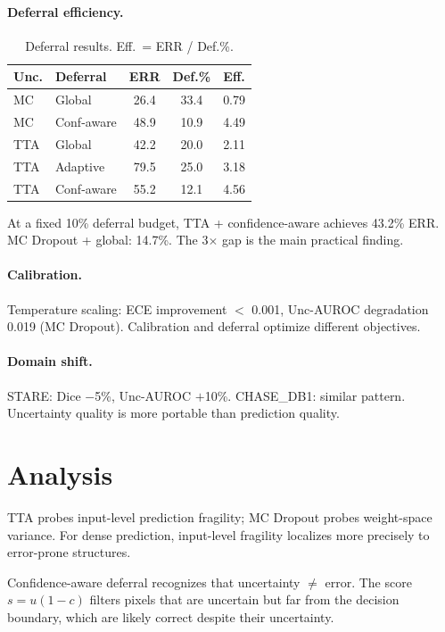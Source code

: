 \documentclass[11pt]{article}
\begin{document}
\paragraph{Deferral efficiency.}

\begin{table}[t]
\centering
\small
\begin{tabular}{llccc}
\toprule
Unc. & Deferral & ERR & Def.\% & Eff. \\
\midrule
MC & Global & 26.4 & 33.4 & 0.79 \\
MC & Conf-aware & 48.9 & 10.9 & 4.49 \\
TTA & Global & 42.2 & 20.0 & 2.11 \\
TTA & Adaptive & 79.5 & 25.0 & 3.18 \\
TTA & Conf-aware & 55.2 & 12.1 & 4.56 \\
\bottomrule
\end{tabular}
\caption{Deferral results. Eff.\ = ERR / Def.\%.}
\end{table}

At a fixed 10\% deferral budget, TTA + confidence-aware achieves 43.2\% ERR.
MC Dropout + global: 14.7\%. The 3$\times$ gap is the main practical finding.

\paragraph{Calibration.}
Temperature scaling: ECE improvement $<$ 0.001, Unc-AUROC degradation 0.019
(MC Dropout). Calibration and deferral optimize different objectives.

\paragraph{Domain shift.}
STARE: Dice $-$5\%, Unc-AUROC $+$10\%. CHASE\_DB1: similar pattern. Uncertainty
quality is more portable than prediction quality.

\section{Analysis}

TTA probes input-level prediction fragility; MC Dropout probes weight-space
variance. For dense prediction, input-level fragility localizes more precisely
to error-prone structures.

Confidence-aware deferral recognizes that uncertainty $\neq$ error. The score
$s = u(1-c)$ filters pixels that are uncertain but far from the decision
boundary, which are likely correct despite their uncertainty.
\end{document}
